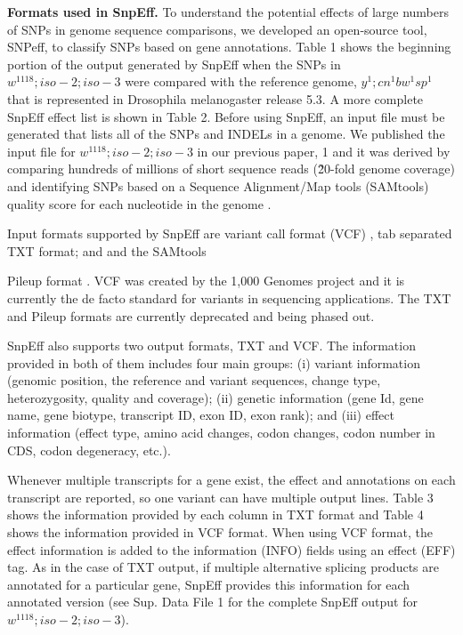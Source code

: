 \textbf{Formats used in SnpEff.} To understand the potential effects of large numbers of SNPs in genome sequence comparisons, we developed an open-source tool, SNPeff, to classify SNPs based on gene annotations. Table 1 shows the beginning portion of the output generated by SnpEff when the SNPs in $w^{1118} ; iso-2; iso-3$ were compared with the reference genome, $y^1 ; cn^1 bw^1 sp^1$ that is represented in Drosophila melanogaster release 5.3. A more complete SnpEff effect list is shown in Table 2. Before using SnpEff, an input file must be generated that lists all of the SNPs and INDELs in a genome. We published the input file for $w^{1118} ; iso-2; iso-3$ in our previous paper, 1 and it was derived by comparing hundreds of millions of short sequence reads (\~20-fold genome coverage) and identifying SNPs based on a Sequence Alignment/Map tools (SAMtools) quality score for each nucleotide in the genome \cite{li2011improving}.

Input formats supported by SnpEff are variant call format (VCF) \cite{danecek2011variant}, tab separated TXT format; and and the SAMtools

Pileup format \cite{li2011improving}. VCF was created by the 1,000 Genomes project and it is currently the de facto standard for variants in sequencing applications. The TXT and Pileup formats are currently deprecated and being phased out.

SnpEff also supports two output formats, TXT and VCF. The information provided in both of them includes four main groups: (i) variant information (genomic position, the reference and variant sequences, change type, heterozygosity, quality and coverage); (ii) genetic information (gene Id, gene name, gene biotype, transcript ID, exon ID, exon rank); and (iii) effect information (effect type, amino acid changes, codon changes, codon number in CDS, codon degeneracy, etc.).

Whenever multiple transcripts for a gene exist, the effect and annotations on each transcript are reported, so one variant can have multiple output lines. Table 3 shows the information provided by each column in TXT format and Table 4 shows the information provided in VCF format. When using VCF format, the effect information is added to the information (INFO) fields using an effect (EFF) tag. As in the case of TXT output, if multiple alternative splicing products are annotated for a particular gene, SnpEff provides this information for each annotated version (see Sup. Data File 1 for the complete SnpEff output for $w^{1118} ; iso-2; iso-3$).

